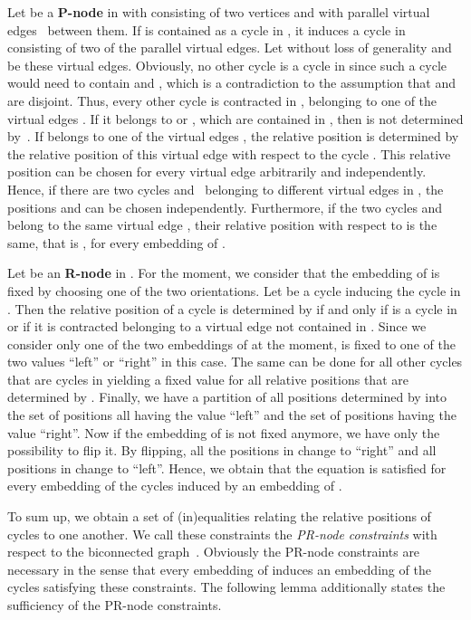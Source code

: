 \documentclass{scrartcl}
\newcommand{\1}[1]{{\normalfont \ensuremath{#1^{\tiny\circled{1}}}}} \newcommand{\2}[1]{{\normalfont \ensuremath{#1^{\tiny\circled{2}}}}} \renewcommand{\k}[1]{{\normalfont \ensuremath{#1^{\tiny\circled{k}}}}} \newcommand{\proj}[2]{\ensuremath{\left.#1\right|_{#2}}} \newcommand{\eps}{\varepsilon}
\theoremstyle{plain} \newtheorem{theorem}{Theorem} \newcounter{lemmacounter} \setcounter{lemmacounter}{0} \newtheorem{lemma}[lemmacounter]{Lemma} \newtheorem{fact}{Fact}  \newtheorem{corollary}{Corollary} \theoremstyle{definition} \newtheorem{definition}{Definition}
\begin{document}
Let  be a {\bf P-node} in  with 
consisting of two vertices  and  with parallel virtual
edges~ between them.  If 
is contained as a cycle in , it induces a cycle 
in  consisting of two of the parallel virtual edges.  Let
without loss of generality  and  be these virtual
edges.  Obviously, no other cycle  is a cycle in
 since such a cycle would need to contain  and ,
which is a contradiction to the assumption that  and  are
disjoint.  Thus, every other cycle  is contracted in ,
belonging to one of the virtual edges .  If
it belongs to  or , which are contained in ,
then  is not determined by~.  If  belongs to
one of the virtual edges , the relative
position  is determined by the relative position of this
virtual edge with respect to the cycle .  This relative
position can be chosen for every virtual edge  arbitrarily and independently.  Hence, if there are two
cycles  and~ belonging to different virtual edges in , the
positions  and  can be chosen
independently.  Furthermore, if the two cycles  and  belong
to the same virtual edge ,
their relative position with respect to  is the same, that is
, for every embedding of .

Let  be an {\bf R-node} in .  For the moment, we
consider that the embedding of  is fixed by choosing one
of the two orientations.  Let  be a cycle inducing the cycle
 in .  Then the relative position 
of a cycle  is determined by  if and only if  is a
cycle in  or if it is contracted belonging to a virtual
edge not contained in .  Since we consider only one of the two
embeddings of  at the moment,  is fixed to
one of the two values ``left'' or ``right'' in this case.  The same
can be done for all other cycles that are cycles in 
yielding a fixed value for all relative positions that are determined
by .  Finally, we have a partition of all positions determined by
 into the set of positions  all
having the value ``left'' and the set of positions 
having the value ``right''.  Now if the embedding of  is
not fixed anymore, we have only the possibility to flip it.  By
flipping, all the positions in  change to ``right'' and
all positions in  change to ``left''.  Hence, we obtain
that the equation  is satisfied for every embedding of the
cycles  induced by an embedding of
.

To sum up, we obtain a set of (in)equalities relating the relative
positions of cycles to one another.  We call these constraints the
\emph{PR-node constraints} with respect to the biconnected graph~.
Obviously the PR-node constraints are necessary in the sense that
every embedding of  induces an embedding of the cycles  satisfying these constraints.  The following
lemma additionally states the sufficiency of the PR-node constraints.
\end{document}
